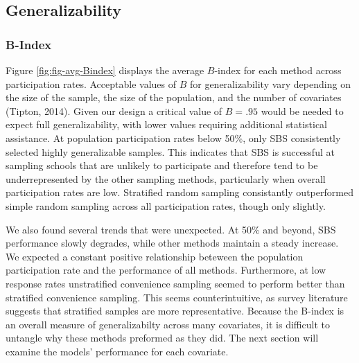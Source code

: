\documentclass[man,floatsintext]{apa6}
\begin{document}
\hypertarget{generalizability-1}{%
\subsection{Generalizability}\label{generalizability-1}}

\hypertarget{b-index}{%
\subsubsection{B-Index}\label{b-index}}

Figure \ref{fig:fig-avg-Bindex} displays the average \(B\)-index for each method across participation rates. Acceptable values of \(B\) for generalizability vary depending on the size of the sample, the size of the population, and the number of covariates (Tipton, 2014). Given our design a critical value of \(B = .95\) would be needed to expect full generalizability, with lower values requiring additional statistical assistance. At population participation rates below 50\%, only SBS consistently selected highly generalizable samples. This indicates that SBS is successful at sampling schools that are unlikely to participate and therefore tend to be underrepresented by the other sampling methods, particularly when overall participation rates are low. Stratified random sampling consistantly outperformed simple random sampling across all participation rates, though only slightly.

We also found several trends that were unexpected. At 50\% and beyond, SBS performance slowly degrades, while other methods maintain a steady increase. We expected a constant positive relationship beteween the population participation rate and the performance of all methods. Furthermore, at low response rates unstratified convenience sampling seemed to perform better than stratified convenience sampling. This seems counterintuitive, as survey literature suggests that stratified samples are more representative. Because the B-index is an overall measure of generalizabilty across many covariates, it is difficult to untangle why these methods preformed as they did. The next section will examine the models' performance for each covariate.
\end{document}

